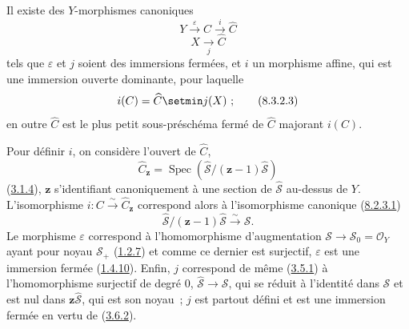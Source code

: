 \begin{proposition}[8.3.2]
\label{II.8.3.2-fr}
Il existe des $Y$-morphismes canoniques
\begin{equation}
\label{II.8.3.2.1-fr}
  Y\xrightarrow{\varepsilon}C\xrightarrow{i}\widehat{C}
\tag{8.3.2.1}
\end{equation}
\begin{equation}
\label{II.8.3.2.2-fr}
  X\xrightarrow[j]{}\widehat{C}
\tag{8.3.2.2}
\end{equation}
tels que $\varepsilon$ et $j$ soient des immersions fermées, et $i$ un
morphisme affine, qui est une immersion ouverte dominante, pour laquelle
\begin{equation}
\label{II.8.3.2.3-fr}
  i(C)=\widehat{C}\setmin j(X)~;
\tag{8.3.2.3}
\end{equation}
en outre $\widehat{C}$ est le plus petit sous-préschéma fermé de $\widehat{C}$
majorant $i(C)$.
\end{proposition}

Pour définir $i$, on considère l'ouvert de $\widehat{C}$,
\begin{equation}
\label{II.8.3.2.4-fr}
  \widehat{C}_{\mathbf{z}}=
  \operatorname{Spec}(\widehat{\mathcal{S}}/(\mathbf{z}-1)\widehat{\mathcal{S}})
\tag{8.3.2.4}
\end{equation}
(\hyperref[II.3.1.4-fr]{3.1.4}), $\mathbf{z}$ s'identifiant canoniquement à une
section de $\widehat{\mathcal{S}}$ au-dessus de $Y$. L'isomorphisme
$i:C\xrightarrow{\sim}\widehat{C}_{\mathbf{z}}$ correspond alors à l'isomorphisme
canonique (\hyperref[II.8.2.3.1-fr]{8.2.3.1})
\[
  \widehat{\mathcal{S}}/(\mathbf{z}-1)\widehat{\mathcal{S}}
  \xrightarrow{\sim}\mathcal{S}.
\]
Le morphisme $\varepsilon$ correspond à l'homomorphisme d'augmentation
$\mathcal{S}\to\mathcal{S}_0=\mathcal{O}_Y$ ayant pour noyau
$\mathcal{S}_+$ (\hyperref[II.1.2.7-fr]{1.2.7}) et comme ce dernier est
surjectif, $\varepsilon$ est une immersion fermée
(\hyperref[II.1.4.10-fr]{1.4.10}). Enfin, $j$ correspond de même
(\hyperref[II.3.5.1-fr]{3.5.1}) à l'homomorphisme surjectif de degré $0$,
$\widehat{\mathcal{S}}\to\mathcal{S}$, qui se réduit à l'identité dans
$\mathcal{S}$ et est nul dans $\mathbf{z}\widehat{\mathcal{S}}$, qui est son noyau~;
$j$ est partout défini et est une immersion fermée en vertu de
(\hyperref[II.3.6.2-fr]{3.6.2}).

